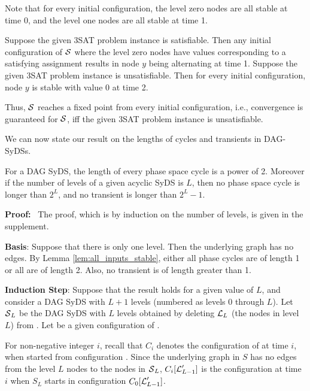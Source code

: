 Note that for every initial configuration, the level zero nodes are all stable at time 0,
and the level one nodes are all stable at time 1.

\smallskip
Suppose the given 3SAT problem instance is satisfiable.
Then any initial configuration of $\mbox{$\mathcal{S}$}$ where the level zero nodes 
have values corresponding to a satisfying assignment
results in node $y$ being alternating at time 1.
Suppose the given 3SAT problem instance is unsatisfiable.
Then for every initial configuration, node $y$ is stable with value 0 at time 2.

\smallskip
Thus, $\mbox{$\mathcal{S}$}$ reaches a fixed point from every initial configuration, 
i.e.,  convergence is guaranteed for $\mbox{$\mathcal{S}$}$,
iff the given 3SAT problem instance is unsatisfiable.
\QED
\fi

We can now state our result on the lengths of cycles and
transients in DAG-SyDSs.

\begin{theorem}\label{thm:levels_phase_space}
For a DAG SyDS,
the length of every phase space cycle is a power of 2.
Moreover if the number of levels of a given acyclic SyDS is $L$,
then no phase space cycle is longer than $2^L$,
and no transient is longer than $2^L-1$.
\end{theorem}

\noindent
\textbf{Proof:}~ The proof, which is by induction on the number of levels,
is given in the supplement.

\iffalse
\noindent
{\bf Basis}: Suppose that there is only one level.
Then the underlying  graph has no edges.
By Lemma \ref{lem:all_inputs_stable},
either all phase cycles are of length 1 or all are of length 2. 
Also, no transient is of length greater than 1.

{\bf Induction Step}: Suppose that the result holds for a given value of $L$,
and consider a DAG SyDS \cals{} with $L+1$ levels (numbered as levels 0 through $L$).
Let $\mbox{$\mathcal{S}$}_L$ be the DAG SyDS with $L$ levels obtained 
by deleting $\mbox{$\mathcal{L}$}_L$ (the nodes in level $L$) from \cals{}.
Let \calc{} be a given configuration of \cals{}.

For non-negative integer $i$, 
recall that $C_i$ denotes the configuration of \cals{} at time $i$, 
when started from configuration \calc{}.
Since the underlying graph in $S$ has 
no edges from the level $L$ nodes to the nodes in $\mbox{$\mathcal{S}$}_L$,
$C_i[\mbox{$\mathcal{L}$}_{L-1}']$ is the configuration at time $i$ 
when $S_L$ starts in configuration $C_0[\mbox{$\mathcal{L}$}_{L-1}']$.

